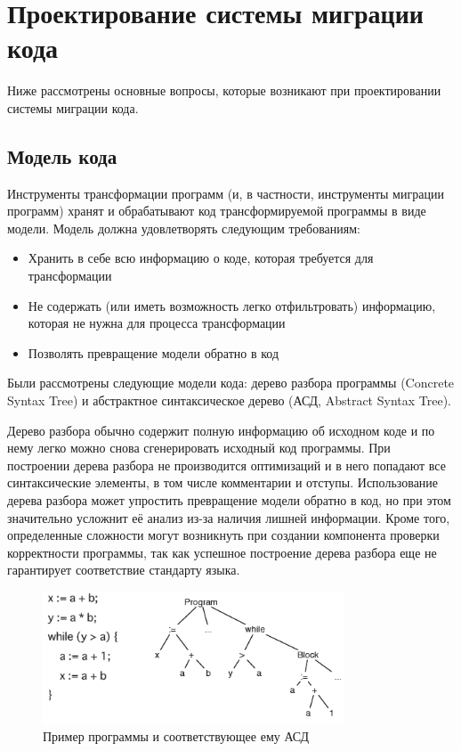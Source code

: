 \section{Проектирование системы миграции кода}
Ниже рассмотрены основные вопросы, которые возникают при проектировании системы миграции кода.

\subsection{Модель кода}
Инструменты трансформации программ (и, в частности, инструменты миграции программ) хранят и обрабатывают код трансформируемой программы в виде модели. Модель должна удовлетворять следующим требованиям:

\begin{itemize}
\item Хранить в себе всю информацию о коде, которая требуется для трансформации
\item Не содержать (или иметь возможность легко отфильтровать) информацию, которая не нужна для процесса трансформации
\item Позволять превращение модели обратно в код
\end{itemize}

Были рассмотрены следующие модели кода: дерево разбора программы (Concrete Syntax Tree) и абстрактное синтаксическое дерево (АСД, Abstract Syntax Tree).

Дерево разбора обычно содержит полную информацию об исходном коде и по нему легко можно снова сгенерировать исходный код программы. При построении дерева разбора не производится оптимизаций и в него попадают все синтаксические элементы, в том числе комментарии и отступы. Использование дерева разбора может упростить превращение модели обратно в код, но при этом значительно усложнит её анализ из-за наличия лишней информации. Кроме того, определенные сложности могут возникнуть при создании компонента проверки корректности программы, так как успешное построение дерева разбора еще не гарантирует соответствие стандарту языка.

\begin{figure}[H]
	\centering
	\includegraphics[width=0.8\textwidth]{ast.png}
	\caption{Пример программы и соответствующее ему АСД}%
\end{figure}

